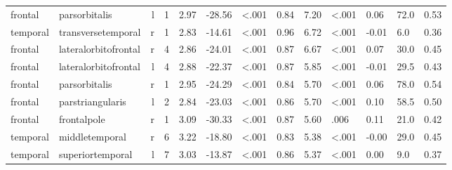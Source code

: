 \documentclass{article}
\begin{document}
\begin{longtable}{llrR{1.5cm}R{1cm}R{1.3cm}R{1cm}R{1cm}R{1.3cm}R{1cm}R{1.8cm}R{1.3cm}R{1.8cm}}
\bottomrule
\endlastfoot
   frontal &             parsorbitalis &    l &            1 &                  2.97 &           -28.56 &      \textless.001 &                               0.84 &                          7.20 &                   \textless.001 &  0.06 &   72.0 &      0.53 \\
  temporal &        transversetemporal &    r &            1 &                  2.83 &           -14.61 &      \textless.001 &                               0.96 &                          6.72 &                   \textless.001 & -0.01 &    6.0 &      0.36 \\
   frontal &      lateralorbitofrontal &    r &            4 &                  2.86 &           -24.01 &      \textless.001 &                               0.87 &                          6.67 &                   \textless.001 &  0.07 &   30.0 &      0.45 \\
   frontal &      lateralorbitofrontal &    l &            4 &                  2.88 &           -22.37 &      \textless.001 &                               0.87 &                          5.85 &                   \textless.001 & -0.01 &   29.5 &      0.43 \\
   frontal &             parsorbitalis &    r &            1 &                  2.95 &           -24.29 &      \textless.001 &                               0.84 &                          5.70 &                   \textless.001 &  0.06 &   78.0 &      0.54 \\
   frontal &          parstriangularis &    l &            2 &                  2.84 &           -23.03 &      \textless.001 &                               0.86 &                          5.70 &                   \textless.001 &  0.10 &   58.5 &      0.50 \\
   frontal &               frontalpole &    r &            1 &                  3.09 &           -30.33 &      \textless.001 &                               0.87 &                          5.60 &                            .006 &  0.11 &   21.0 &      0.42 \\
  temporal &            middletemporal &    r &            6 &                  3.22 &           -18.80 &      \textless.001 &                               0.83 &                          5.38 &                   \textless.001 & -0.00 &   29.0 &      0.45 \\
  temporal &          superiortemporal &    l &            7 &                  3.03 &           -13.87 &      \textless.001 &                               0.86 &                          5.37 &                   \textless.001 &  0.00 &    9.0 &      0.37 \\

\end{longtable}
\end{document}
